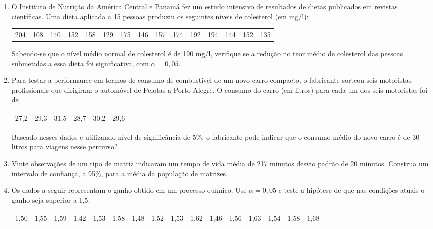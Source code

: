 \documentclass[10pt,brazil,addpoints]{exam}
\begin{document}
\begin{enumerate}[1.]
\medskip
\item O Instituto de Nutrição da América Central e Panamá fez um estudo intensivo de resultados de dietas publicados em revistas científicas. Uma dieta aplicada a 15 pessoas produziu os seguintes níveis de colesterol (em mg/l):
\begin{center}
\begin{tabular}{ccccccccccccccc}
204 & 108 &  140 &  152 &  158 &  129 &  175 &  146 &  157 &  174 &  192 &  194 &  144 & 152  & 135
\end{tabular}
\end{center}

Sabendo-se que o nível médio normal de colesterol é de 190 mg/l, verifique se a redução no teor médio de colesterol das pessoas submetidas a essa dieta foi significativa, com $\alpha=0,05$.



\medskip
\item Para testar a performance em termos de consumo de combustível de um novo carro compacto, o fabricante sorteou seis motoristas profissionais que dirigiram o automóvel de Pelotas a Porto Alegre. O consumo do carro (em litros) para cada um dos seis motoristas foi de
\begin{center}
\begin{tabular}{ccccccc}
27,2&     29,3&     31,5&     28,7&     30,2&  29,6
\end{tabular}
\end{center}

Baseado nesses dados e utilizando nível de significância de 5\%, o fabricante pode indicar que o consumo médio do novo carro é de 30 litros para viagens nesse percurso?



\medskip
\item Vinte observações de um tipo de matriz indicaram um tempo de vida média de 217 minutos desvio padrão de 20 minutos. Construa um intervalo de confiança, a 95\%, para a média da população de matrizes.





\medskip
\item Os dados a seguir representam o ganho obtido em um processo químico. Use $\alpha = 0,05$ e teste a hipótese de que nas condições atuais o ganho seja superior a 1,5.
\begin{center}
\begin{tabular}{cccccccccccccccc}
1,50 & 1,55 & 1,59 & 1,42 & 1,53 & 1,58 & 1,48 & 1,52 &
1,53 & 1,62 & 1,46 & 1,56 & 1,63 & 1,54 & 1,58 & 1,68
\end{tabular}
\end{center}




\end{enumerate}
\end{document}
